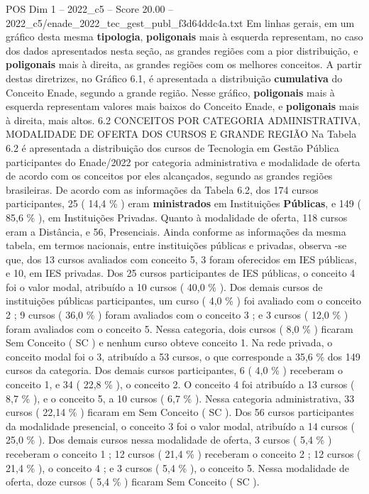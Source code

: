 \begin{textsample}{POS Dim 1 – 2022\_c5 – Score 20.00 – 2022\_c5/enade\_2022\_tec\_gest\_publ\_f3d64ddc4a.txt}
Em linhas gerais, em um gráfico desta mesma \textbf{tipologia}, \textbf{poligonais} mais à esquerda representam, no caso dos dados apresentados nesta seção, as grandes regiões com a pior distribuição, e \textbf{poligonais} mais à direita, as grandes regiões com os melhores conceitos.
A partir destas diretrizes, no Gráfico 6.1, é apresentada a distribuição \textbf{cumulativa} do Conceito Enade, segundo a grande região.
Nesse gráfico, \textbf{poligonais} mais à esquerda representam valores mais baixos do Conceito Enade, e \textbf{poligonais} mais à direita, mais altos. 6.2 CONCEITOS POR CATEGORIA ADMINISTRATIVA, MODALIDADE DE OFERTA DOS CURSOS E GRANDE REGIÃO Na Tabela 6.2 é apresentada a distribuição dos cursos de Tecnologia em Gestão Pública participantes do Enade/2022 por categoria administrativa e modalidade de oferta de acordo com os conceitos por eles alcançados, segundo as grandes regiões brasileiras.
De acordo com as informações da Tabela 6.2, dos 174 cursos participantes, 25 ( 14,4 \% ) eram \textbf{ministrados} em Instituições \textbf{Públicas}, e 149 ( 85,6 \% ), em Instituições Privadas.
Quanto à modalidade de oferta, 118 cursos eram a Distância, e 56, Presenciais.
Ainda conforme as informações da mesma tabela, em termos nacionais, entre instituições públicas e privadas, observa -se que, dos 13 cursos avaliados com conceito 5, 3 foram oferecidos em IES públicas, e 10, em IES privadas.
Dos 25 cursos participantes de IES públicas, o conceito 4 foi o valor modal, atribuído a 10 cursos ( 40,0 \% ).
Dos demais cursos de instituições públicas participantes, um curso ( 4,0 \% ) foi avaliado com o conceito 2 ; 9 cursos ( 36,0 \% ) foram avaliados com o conceito 3 ; e 3 cursos ( 12,0 \% ) foram avaliados com o conceito 5.
Nessa categoria, dois cursos ( 8,0 \% ) ficaram Sem Conceito ( SC ) e nenhum curso obteve conceito 1.
Na rede privada, o conceito modal foi o 3, atribuído a 53 cursos, o que corresponde a 35,6 \% dos 149 cursos da categoria.
Dos demais cursos participantes, 6 ( 4,0 \% ) receberam o conceito 1, e 34 ( 22,8 \% ), o conceito 2.
O conceito 4 foi atribuído a 13 cursos ( 8,7 \% ), e o conceito 5, a 10 cursos ( 6,7 \% ).
Nessa categoria administrativa, 33 cursos ( 22,14 \% ) ficaram em Sem Conceito ( SC ).
Dos 56 cursos participantes da modalidade presencial, o conceito 3 foi o valor modal, atribuído a 14 cursos ( 25,0 \% ).
Dos demais cursos nessa modalidade de oferta, 3 cursos ( 5,4 \% ) receberam o conceito 1 ; 12 cursos ( 21,4 \% ) receberam o conceito 2 ; 12 cursos ( 21,4 \% ), o conceito 4 ; e 3 cursos ( 5,4 \% ), o conceito 5.
Nessa modalidade de oferta, doze cursos ( 5,4 \% ) ficaram Sem Conceito ( SC ).

\end{textsample}
